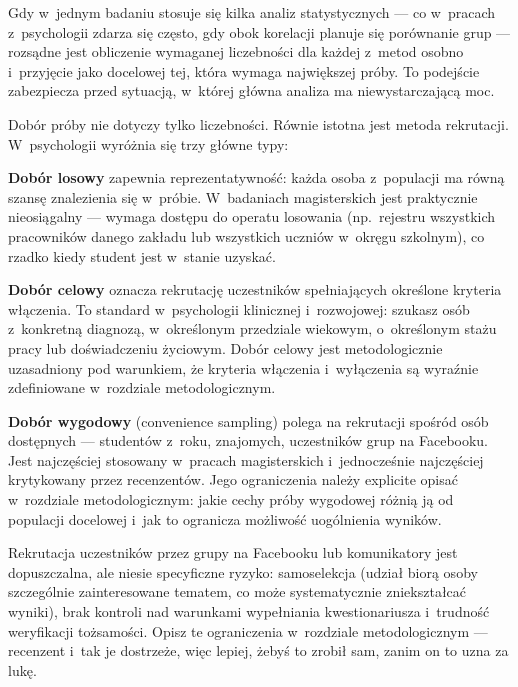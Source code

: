 \documentclass[12pt,a4paper,twoside,openany]{book}
\begin{document}
Gdy w~jednym badaniu stosuje się kilka analiz statystycznych --- co w~pracach z~psychologii zdarza się często, gdy obok korelacji planuje się porównanie grup --- rozsądne jest obliczenie wymaganej liczebności dla każdej z~metod osobno i~przyjęcie jako docelowej tej, która wymaga największej próby. To podejście zabezpiecza przed sytuacją, w~której główna analiza ma niewystarczającą moc.

Dobór próby nie dotyczy tylko liczebności. Równie istotna jest metoda rekrutacji. W~psychologii wyróżnia się trzy główne typy:

\textbf{Dobór losowy} zapewnia reprezentatywność: każda osoba z~populacji ma równą szansę znalezienia się w~próbie. W~badaniach magisterskich jest praktycznie nieosiągalny --- wymaga dostępu do operatu losowania (np.\ rejestru wszystkich pracowników danego zakładu lub wszystkich uczniów w~okręgu szkolnym), co rzadko kiedy student jest w~stanie uzyskać.

\textbf{Dobór celowy} oznacza rekrutację uczestników spełniających określone kryteria włączenia. To standard w~psychologii klinicznej i~rozwojowej: szukasz osób z~konkretną diagnozą, w~określonym przedziale wiekowym, o~określonym stażu pracy lub doświadczeniu życiowym. Dobór celowy jest metodologicznie uzasadniony pod warunkiem, że kryteria włączenia i~wyłączenia są wyraźnie zdefiniowane w~rozdziale metodologicznym.

\textbf{Dobór wygodowy} (convenience sampling) polega na rekrutacji spośród osób dostępnych --- studentów z~roku, znajomych, uczestników grup na Facebooku. Jest najczęściej stosowany w~pracach magisterskich i~jednocześnie najczęściej krytykowany przez recenzentów. Jego ograniczenia należy explicite opisać w~rozdziale metodologicznym: jakie cechy próby wygodowej różnią ją od populacji docelowej i~jak to ogranicza możliwość uogólnienia wyników.

\begin{warningbox}
Rekrutacja uczestników przez grupy na Facebooku lub komunikatory jest dopuszczalna, ale niesie specyficzne ryzyko: samoselekcja (udział biorą osoby szczególnie zainteresowane tematem, co może systematycznie zniekształcać wyniki), brak kontroli nad warunkami wypełniania kwestionariusza i~trudność weryfikacji tożsamości. Opisz te ograniczenia w~rozdziale metodologicznym --- recenzent i~tak je dostrzeże, więc lepiej, żebyś to zrobił sam, zanim on to uzna za lukę.
\end{warningbox}
\end{document}
